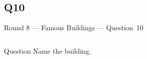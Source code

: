 \documentclass[11pt]{beamer}
\begin{document}
\subsection*{Q10}
\begin{frame}[t]{Round 8 --- Famous Buildings --- \mbox{Question 10}}
\vspace{-0.5em}
\begin{columns}[T,totalwidth=\linewidth]
\begin{column}{0.32\linewidth}
\begin{block}{Question}
Name the building.
\end{block}
\end{column}
\begin{column}{0.65\linewidth}
\begin{center}
\texttt{[image: \{Images/seagram]}.jpg}
\end{center}
\end{column}
\end{columns}
\end{frame}
\end{document}
